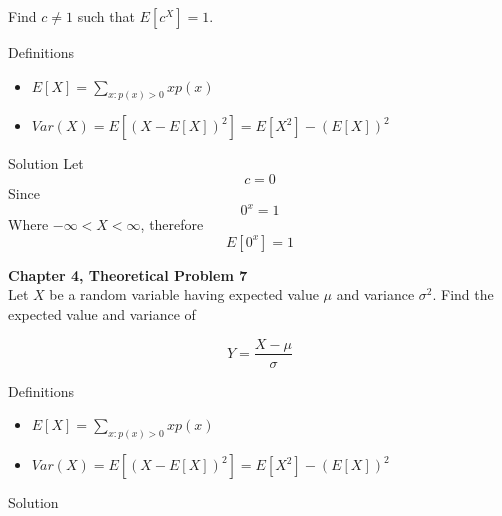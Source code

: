 \documentclass{article}
\begin{document}
\begin{spacing}{1.1}
\begin{homeworkProblem}
  Find $c \neq 1$ such that $E[ c^X] = 1$.
  \begin{homeworkSection}{Definitions}
      \begin{itemize}
        \item $E[ X] = \sum\limits_{x:p( x) > 0}{ x p( x)}$
        \item $Var( X) = E[ (X - E[ X])^2] = E[ X^2] - (E[ X])^2$
      \end{itemize}
  \end{homeworkSection}
  \begin{homeworkSection}{Solution}
    Let 
      \[c = 0\]
    Since
      \[0^x = 1\]
    Where $-\infty < X < \infty$, therefore
      \[E[ 0^x] = 1\]

  \end{homeworkSection}
\end{homeworkProblem}

\newpage
\begin{homeworkProblem}
  {\bf Chapter 4, Theoretical Problem 7}\\
  Let $X$ be a random variable having expected value
  $\mu$ and variance $\sigma^2$. Find the expected
  value and variance of

  \[Y = \frac{ X - \mu}{ \sigma}\]

  \begin{homeworkSection}{Definitions}
      \begin{itemize}
        \item $E[ X] = \sum\limits_{x:p( x) > 0}{ x p( x)}$
        \item $Var( X) = E[ (X - E[ X])^2] = E[ X^2] - (E[ X])^2$
      \end{itemize}
  \end{homeworkSection}
  \begin{homeworkSection}{Solution}


  \end{homeworkSection}
\end{homeworkProblem}
\end{spacing}
\end{document}

